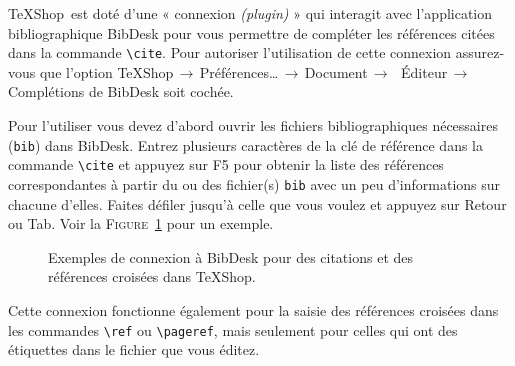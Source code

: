 \documentclass[11pt,french]{article}
\newcommand{\TS}{\textsf{\TeX Shop}}
\newcommand{\cmd}[1]{\textsf{#1}}
\newcommand{\mnu}[1]{\textsf{#1}}
\newcommand{\To}{\,\(\to\)\,}
\begin{document}
\TS\ est doté d'une « connexion \emph{(plugin)} » qui interagit avec l'application bibliographique \cmd{BibDesk} pour vous permettre de compléter les références citées dans la commande \verb|\cite|. Pour autoriser l'utilisation de cette connexion assurez-vous que l'option \mnu{TeXShop}\To\mnu{Préférences…}\To\mnu{Document}\To\ \mnu{Éditeur}\To\mnu{Complétions de BibDesk} soit cochée.

Pour l'utiliser vous devez d'abord ouvrir les fichiers bibliographiques nécessaires (\texttt{bib}) dans \cmd{BibDesk}. Entrez plusieurs caractères de la clé de référence dans la commande \verb|\cite| et appuyez sur \cmd{F5} pour obtenir la liste des références correspondantes à partir du ou des fichier(s) \texttt{bib} avec un peu d'informations sur chacune d'elles. Faites défiler jusqu'à celle que vous voulez et appuyez sur \cmd{Retour} ou \cmd{Tab}. Voir la \textsc{Figure}~\ref{fig:bibdesk} pour un exemple.

%
\begin{figure}
\centering
{}\qquad{}
\caption{Exemples de connexion à \textsf{BibDesk} pour des citations et des références croisées dans \TS.\label{fig:bibdesk}}
\end{figure}
Cette connexion fonctionne également pour la saisie des références croisées dans les commandes \verb|\ref| ou \verb|\pageref|, mais seulement pour celles qui ont des étiquettes dans le fichier que vous éditez.
\end{document}
